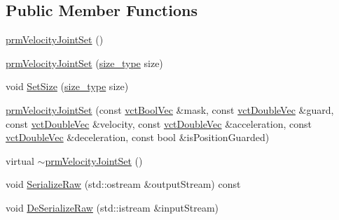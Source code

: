 \subsection*{Public Member Functions}
\begin{DoxyCompactItemize}
\item 
\hyperlink{classprm_velocity_joint_set_a6c2c220f64bc8fafb07241815f2546de}{prm\+Velocity\+Joint\+Set} ()
\item 
\hyperlink{classprm_velocity_joint_set_a17bb88da2e0fe253726edd28b64235bb}{prm\+Velocity\+Joint\+Set} (\hyperlink{classprm_velocity_joint_set_a48434c7a4127357203c7cff1e6f2a429}{size\+\_\+type} size)
\item 
void \hyperlink{classprm_velocity_joint_set_a307b54b4c94077003b5aa83531b6bc07}{Set\+Size} (\hyperlink{classprm_velocity_joint_set_a48434c7a4127357203c7cff1e6f2a429}{size\+\_\+type} size)
\item 
\hyperlink{classprm_velocity_joint_set_a756a5405815b878cf325ed779582100e}{prm\+Velocity\+Joint\+Set} (const \hyperlink{vct_dynamic_vector_types_8h_aeb2237c134aee3769198bd9d55c8a9e0}{vct\+Bool\+Vec} \&mask, const \hyperlink{vct_dynamic_vector_types_8h_ade4b3068c86fb88f41af2e5187e491c2}{vct\+Double\+Vec} \&guard, const \hyperlink{vct_dynamic_vector_types_8h_ade4b3068c86fb88f41af2e5187e491c2}{vct\+Double\+Vec} \&velocity, const \hyperlink{vct_dynamic_vector_types_8h_ade4b3068c86fb88f41af2e5187e491c2}{vct\+Double\+Vec} \&acceleration, const \hyperlink{vct_dynamic_vector_types_8h_ade4b3068c86fb88f41af2e5187e491c2}{vct\+Double\+Vec} \&deceleration, const bool \&is\+Position\+Guarded)
\item 
virtual \hyperlink{classprm_velocity_joint_set_a462dcbe624a12501c8e9d4d6bcd31e51}{$\sim$prm\+Velocity\+Joint\+Set} ()
\item 
void \hyperlink{classprm_velocity_joint_set_ad1696e1f58de23b8d9882bd5be3aa5f9}{Serialize\+Raw} (std\+::ostream \&output\+Stream) const 
\item 
void \hyperlink{classprm_velocity_joint_set_a78b5acf3b0ee1c5de26b3e8e89009079}{De\+Serialize\+Raw} (std\+::istream \&input\+Stream)
\end{DoxyCompactItemize}
